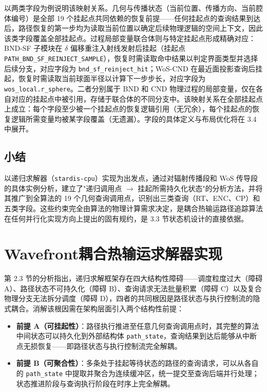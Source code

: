 以两类字段为例说明该映射关系。几何与传播状态（当前位置、传播方向、当前腔体编号）是全部 19 个挂起点共同依赖的恢复前提——任何挂起点的查询结果到达后，路径恢复的第一步均为读取当前位置以确定后续物理逻辑的空间上下文，因此该类字段覆盖全部挂起点。过程局部变量联合体则与特定挂起点形成精确对应：BND-SF 子模块在 $\delta$ 偏移重注入射线发射后挂起（挂起点 \texttt{PATH\_BND\_SF\_REINJECT\_SAMPLE}），恢复时需读取命中结果以判定界面类型并选择后续分支，对应字段为 \texttt{bnd\_sf\_reinject\_hit}；WoS-CND 在最近面投影查询后挂起，恢复时需读取当前球面半径以计算下一步步长，对应字段为 \texttt{wos\_local.r\_sphere}。二者分别属于 BND 和 CND 物理过程的局部变量，仅在各自对应的挂起点中被引用，存储于联合体的不同分支中。该映射关系在全部挂起点上成立：每个字段至少被一个挂起点的恢复逻辑引用（无冗余），每个挂起点的恢复逻辑所需变量均被某字段覆盖（无遗漏）。字段的具体定义与布局优化将在 3.4 中展开。

\subsection{小结}

以递归求解器（\texttt{stardis-cpu}）实现为出发点，通过对辐射传播段和 WoS 传导段的具体实例分析，建立了"递归调用点 $\rightarrow$ 挂起所需持久化状态"的分析方法，并将其推广到全算法的 19 个几何查询调用点，识别出三类查询（RT、ENC、CP）和五类字段。这些约束完全由算法的物理计算需求决定，是耦合热输运路径追踪算法在任何并行化实现方向上提出的固有规约，是 3.3 节状态机设计的直接依据。

\section{Wavefront耦合热输运求解器实现}

第 2.3 节的分析指出，递归求解框架存在四大结构性障碍——调度粒度过大（障碍 A）、路径状态不可持久化（障碍 B）、查询请求无法批量积累（障碍 C）以及复合物理分支无法拆分调度（障碍 D），四者的共同根因是路径状态与执行控制流的隐式耦合。消解该根因需在架构层面引入两个结构性前提：

\begin{itemize}[nosep]
  \item \textbf{前提 A（可挂起性）}：路径执行推进至任意几何查询调用点时，其完整的算法中间状态可以持久化到外部结构体 \texttt{path\_state}，查询结果到达后能够从中断点无损恢复——即路径状态与执行控制流完全解耦。
  \item \textbf{前提 B（可聚合性）}：多条处于挂起等待状态的路径的查询请求，可以从各自的 \texttt{path\_state} 中提取并聚合为连续缓冲区，统一提交至查询后端并行处理；状态推进阶段与查询执行阶段在时序上完全解耦。
\end{itemize}

